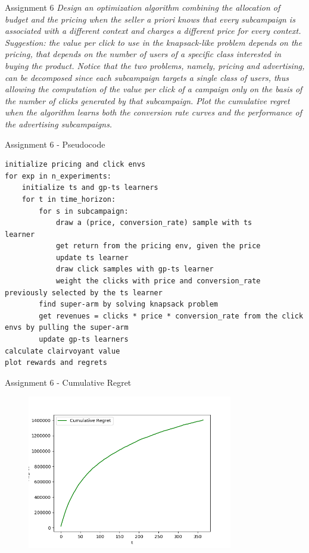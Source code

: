 \documentclass[11pt]{beamer}
\begin{document}
\begin{frame}{Assignment 6}
\textit{Design an optimization algorithm combining the allocation of budget and the pricing when the seller a priori knows that every subcampaign is associated with a different context and charges a different price for every context. Suggestion: the value per click to use in the knapsack-like problem depends on the pricing, that depends on the number of users of a specific class interested in buying the product. Notice that the two problems, namely, pricing and advertising, can be decomposed since each subcampaign targets a single class of users, thus allowing the computation of the value per click of a campaign only on the basis of the number of clicks generated by that subcampaign. Plot the cumulative regret when the algorithm learns both the conversion rate curves and the performance of the advertising subcampaigns.}
\end{frame}

\begin{frame}[fragile]{Assignment 6 - Pseudocode}
\begin{lstlisting}
initialize pricing and click envs
for exp in n_experiments:
	initialize ts and gp-ts learners 
	for t in time_horizon:
		for s in subcampaign:
			draw a (price, conversion_rate) sample with ts		learner
			get return from the pricing env, given the price
			update ts learner
			draw click samples with gp-ts learner
			weight the clicks with price and conversion_rate	previously selected by the ts learner
		find super-arm by solving knapsack problem
		get revenues = clicks * price * conversion_rate from the click envs by pulling the super-arm
		update gp-ts learners 
calculate clairvoyant value
plot rewards and regrets
\end{lstlisting}
\end{frame}

\begin{frame}{Assignment 6 - Cumulative Regret}
\begin{figure}[hbtp]
\centering
\includegraphics[width=0.8\textwidth]{images/assignment_6_cum_regret.png}
\caption{}
\end{figure}
\end{frame}
\end{document}
